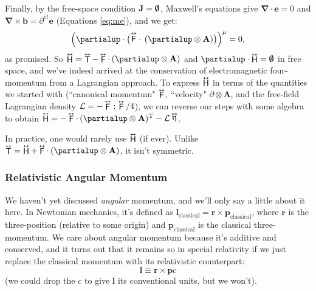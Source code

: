 \documentclass[12pt]{article}
\renewcommand{\vv}[1]{\mathbf{#1}}
\newcommand{\del}{\boldsymbol{\nabla}}
\newcommand{\tightoverset}[2]{%
  \mathop{#2}\limits^{\vbox to -.5ex{\kern-0.75ex\hbox{$#1$}\vss}}}
\newcommand{\inlinedy}[1]{\tightoverset{\text{\tiny$\bm\leftrightarrow$}}{#1}}
\newcommand{\capdy}[1]{ \overset{ \text{\tiny$\bm\leftrightarrow$} }{\vphantom{\text{\small{A}}}\smash{#1}} }
\begin{document}
Finally, by the free-space condition $\vv J = \textrm{\mbox{\boldmath $\emptyset$}}$, Maxwell's equations give $\del \cdot \vv e = 0$ and $\del \times \vv b = \partial^{ct} \vv e$ (Equations \ref{eq:me}), and we get:
\begin{equation*}
\Big( \partialup \cdot \big( \capdy{\mathsf{F}} \cdot \, ( \partialup \otimes \vv A ) \big) \Big)^{\mu} = 0 ,
\end{equation*}
as promised. So $\inlinedy{\mathsf{H}} = \inlinedy{\mathsf{T}} - \inlinedy{\mathsf{F}} \cdot \, ( \partialup \otimes \vv A )$ and $\partialup \cdot \inlinedy{\mathsf{H}} = \textrm{\mbox{\boldmath $\emptyset$}}$ in free space, and we've indeed arrived at the conservation of electromagnetic four-momentum from a Lagrangian approach. To express $\inlinedy{\mathsf{H}}$ in terms of the quantities we started with (``canonical momentum" $\inlinedy{\mathsf{F}}$, ``velocity" $ \partialup \otimes \vv A $, and the free-field Lagrangian density $\mathcal{L} = - \inlinedy{\mathsf{F}} : \inlinedy{\mathsf{F}} / 4$), we can reverse our steps with some algebra to obtain $\inlinedy{\mathsf{H}} = - \inlinedy{\mathsf{F}} \cdot \, ( \partialup \otimes \vv A) {}^{\mathrm{T}} - \mathcal{L} \inlinedy{\upeta}$.

In practice, one would rarely use $\inlinedy{\mathsf{H}}$ (if ever). Unlike $\inlinedy{\mathsf{T}} = \inlinedy{\mathsf{H}} +  \inlinedy{\mathsf{F}} \cdot \, ( \partialup \otimes \vv A )$, it isn't symmetric.


\subsubsection{Relativistic Angular Momentum}

We haven't yet discussed \emph{angular} momentum, and we'll only say a little about it here. In Newtonian mechanics, it's defined as $\vv l_{\mathrm{classical}} = \vv r \times \vv p_{\mathrm{classical}}$, where $\vv r$ is the three-position (relative to some origin) and $\vv p_{\mathrm{classical}}$ is the classical three-momentum. We care about angular momentum because it's additive and conserved, and it turns out that it remains so in special relativity if we just replace the classical momentum with its relativistic counterpart:
\begin{equation*}
\vv l \equiv \vv r \times \vv p c
\end{equation*}
(we could drop the $c$ to give $\vv l$ its conventional units, but we won't).
\end{document}
